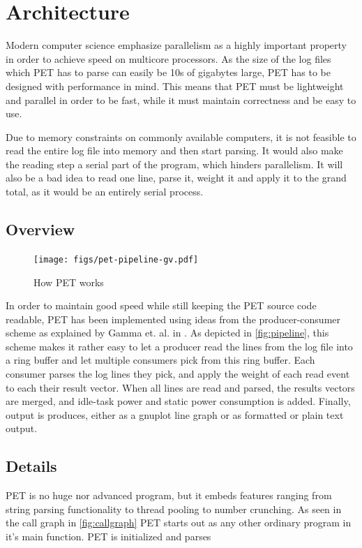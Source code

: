 \section{Architecture}

Modern computer science emphasize parallelism as a highly important property in
order to achieve speed on multicore processors. As the size of the log files
which PET has to parse can easily be 10s of gigabytes large, PET has to be
designed with performance in mind. This means that PET must be lightweight and parallel
in order to be fast, while it must maintain correctness and be easy to use.

Due to memory constraints on commonly available computers, it is not feasible to read the entire log
file into memory and then start parsing. It would also make the reading step a serial part of the program,
which hinders parallelism. It will also be a bad idea to read one line, parse
it, weight it and apply it to the grand total, as it would be an entirely serial process.

\subsection{Overview}

\begin{figure}[ht]
    \texttt{[image: figs/pet-pipeline-gv.pdf]}
    \caption{How PET works}
    \label{fig:pipeline}
\end{figure}

In order to maintain good speed while still keeping the PET source code
readable, PET has been implemented using ideas from the producer-consumer scheme
as explained by Gamma et.  al. in \cite{designpatterns}. As depicted in
\autoref{fig:pipeline}, this scheme makes it rather easy to let a producer read
the lines from the log file into a ring buffer and let multiple consumers pick
from this ring buffer. Each consumer parses the log lines they pick, and apply
the weight of each read event to each their result vector. When all lines are
read and parsed, the results vectors are merged, and idle-task power and static
power consumption is added. Finally, output is produces, either as a gnuplot
line graph or as formatted or plain text output.

\subsection{Details}

PET is no huge nor advanced program, but it embeds features ranging from string
parsing functionality to thread pooling to number crunching. As seen in the call graph
in \autoref{fig:callgraph} PET starts out as any other ordinary program in it's main
function. PET is initialized and parses 


